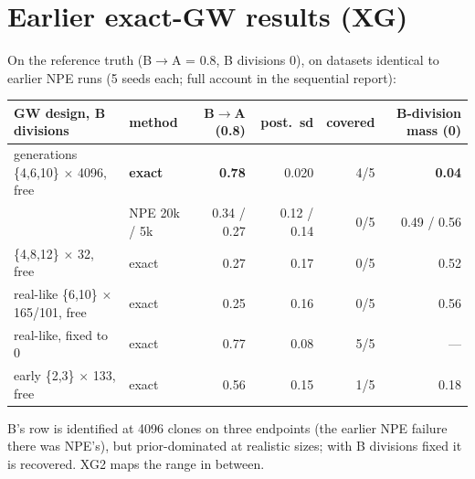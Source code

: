\documentclass[10pt,a4paper]{article}
\newcommand{\BA}{B$\to$A}
\begin{document}
\section{Earlier exact-GW results (XG)}\label{sec:xg}
On the reference truth (\BA{} = 0.8, B divisions 0), on datasets identical to earlier NPE runs (5 seeds each; full account in the sequential report):
\begin{center}\footnotesize\setlength{\tabcolsep}{3pt}
\begin{tabular}{@{}llrrrr@{}}\toprule
GW design, B divisions & method & \BA{} (0.8) & post.\ sd & covered & B-division mass (0) \\\midrule
generations \{4,6,10\} $\times$ 4096, free & \textbf{exact} & \textbf{0.78} & 0.020 & 4/5 & \textbf{0.04} \\
 & NPE 20k / 5k & 0.34 / 0.27 & 0.12 / 0.14 & 0/5 & 0.49 / 0.56 \\
\{4,8,12\} $\times$ 32, free & exact & 0.27 & 0.17 & 0/5 & 0.52 \\
real-like \{6,10\} $\times$ 165/101, free & exact & 0.25 & 0.16 & 0/5 & 0.56 \\
real-like, fixed to 0 & exact & 0.77 & 0.08 & 5/5 & --- \\
early \{2,3\} $\times$ 133, free & exact & 0.56 & 0.15 & 1/5 & 0.18 \\\bottomrule
\end{tabular}
\end{center}
B's row is identified at 4096 clones on three endpoints (the earlier NPE failure there was NPE's), but prior-dominated at realistic sizes; with B divisions fixed it is recovered. XG2 maps the range in between.

\end{document}
